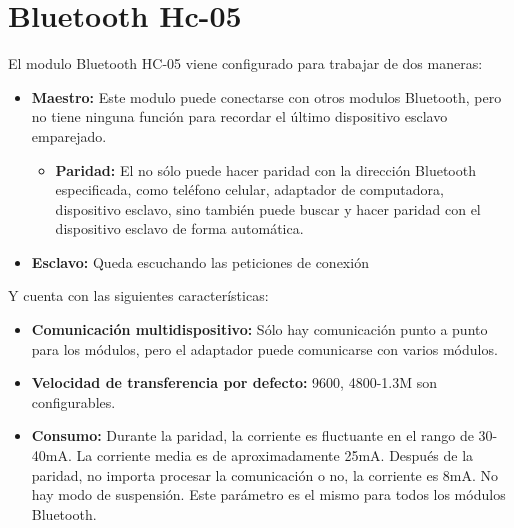 \section{Bluetooth Hc-05}
El modulo Bluetooth HC-05 viene configurado para trabajar de dos maneras:
\begin{itemize}
    \item \textbf{Maestro:} Este modulo puede conectarse con otros modulos Bluetooth, pero no tiene ninguna función para recordar el último dispositivo esclavo emparejado.
    \begin{itemize}
        \item \textbf{Paridad:} El no sólo puede hacer paridad con la dirección Bluetooth especificada, como teléfono celular, adaptador de computadora, dispositivo esclavo, sino también puede buscar y hacer paridad con el dispositivo esclavo de forma automática.
    \end{itemize}
    \item \textbf{Esclavo:} Queda escuchando las peticiones de conexión \\
\end{itemize}
Y cuenta con las siguientes características: 
\begin{itemize}
    \item \textbf{Comunicación multidispositivo:} Sólo hay comunicación punto a punto para los módulos, pero el adaptador puede comunicarse con varios módulos. 
    \item \textbf{Velocidad de transferencia por defecto:} 9600, 4800-1.3M son configurables.
    \item \textbf{Consumo:} Durante la paridad, la corriente es fluctuante en el rango de 30-40mA. La corriente media es de aproximadamente 25mA. Después de la paridad, no importa procesar la comunicación o no, la corriente es 8mA. No hay modo de suspensión. Este parámetro es el mismo para todos los módulos Bluetooth.
\end{itemize}

